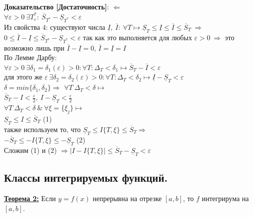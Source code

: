 \documentclass[a4paper,12pt]{article} %
\renewcommand {\leq}{\leqslant}
\begin{document}
	\textbf{Доказательство [Достаточность]}: $\Leftarrow$\\
	$\forall\varepsilon>0~\exists T^{*}_{\varepsilon}:~\overline{S}_{T^{*}}-\underline{S}_{T^{*}}<\varepsilon$\\
	Из свойства 4: существуют числа $\underline{I},~\overline{I}:~\forall T\longmapsto \underline{S}_{T}\leq \underline{I}\leq \overline{I}\leq \overline{S}_{T}~\Rightarrow$\\
	$0\leq \overline{I}-\underline{I}\leq \overline{S}_{T^{*}}-\underline{S}_{T^{*}}<\varepsilon$ так как это выполняется для любых $\varepsilon>0~\Rightarrow$ это возможно лишь при $\overline{I}-\underline{I}=0$, $\overline{I}=\underline{I}=I$\\
	По Лемме Дарбу:\\
	$\forall\varepsilon>0~\exists\delta_1 = \delta_{1}(\varepsilon)>0: \forall T:\Delta_{T}<\delta_1 \longmapsto \overline{S}_T-\overline{I}<\varepsilon$\\
	для этого же $\varepsilon~\exists\delta_2 = \delta_{2}(\varepsilon)>0: \forall T:\Delta_{T}<\delta_2 \longmapsto \underline{I}-\underline{S}_T<\varepsilon$\\
	$\delta=min\{\delta_1,\delta_2\}\Rightarrow$
	$\forall T~\Delta_T<\delta \longmapsto$\\
	$\overline{S}_T-I<\frac{\varepsilon}{2},~I-\underline{S}_T<\frac{\varepsilon}{2}$\\
	$\forall T~\Delta_T<\delta~\&~\forall \xi=\{\xi_j\}\longmapsto$\\
	$\underline{S}_T\leq I\leq \overline{S}_T$ (1)\\
	также используем то, что $\underline{S}_T\leq I\{T,\xi\}\leq \overline{S}_T\Rightarrow$\\
	$-\overline{S}_T\leq -I\{T,\xi\}\leq -\underline{S}_T$ (2)\\
	Сложим (1) и (2) $\Rightarrow |I-I\{T,\xi\}|\leq \overline{S}_T-\underline{S}_T<\varepsilon$\\
	\subsection{Классы интегрируемых функций.}
	
	
	\underline{\textbf{Теорема 2:}} Если $y=f(x)$ непрерывна на отрезке $[a,b]$, то $f$ интегрирума на $[a,b]$.\\
	
\end{document}
